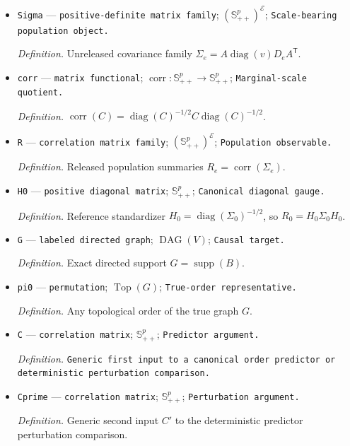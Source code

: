 \documentclass{article}
\begin{document}
\begin{itemize}
  \item \texttt{Sigma} --- \texttt{positive-\allowbreak{}definite matrix family}; \((\mathbb S_{++}^{p})^{\mathcal E}\); \texttt{Scale-\allowbreak{}bearing population object.}
  \par\smallskip\noindent\emph{Definition.} Unreleased covariance family \(\Sigma_e=A\operatorname{diag}(v)D_eA^{\mathsf T}\).
  \item \texttt{corr} --- \texttt{matrix functional}; \(\operatorname{corr}:\mathbb S_{++}^{p}\to\mathbb S_{++}^{p}\); \texttt{Marginal-\allowbreak{}scale quotient.}
  \par\smallskip\noindent\emph{Definition.} \(\operatorname{corr}(C)=\operatorname{diag}(C)^{-1/2}C\operatorname{diag}(C)^{-1/2}\).
  \item \texttt{R} --- \texttt{correlation matrix family}; \((\mathbb S_{++}^{p})^{\mathcal E}\); \texttt{Population observable.}
  \par\smallskip\noindent\emph{Definition.} Released population summaries \(R_e=\operatorname{corr}(\Sigma_e)\).
  \item \texttt{H0} --- \texttt{positive diagonal matrix}; \(\mathbb S_{++}^{p}\); \texttt{Canonical diagonal gauge.}
  \par\smallskip\noindent\emph{Definition.} Reference standardizer \(H_0=\operatorname{diag}(\Sigma_0)^{-1/2}\), so \(R_0=H_0\Sigma_0H_0\).
  \item \texttt{G} --- \texttt{labeled directed graph}; \(\operatorname{DAG}(V)\); \texttt{Causal target.}
  \par\smallskip\noindent\emph{Definition.} Exact directed support \(G=\operatorname{supp}(B)\).
  \item \texttt{pi0} --- \texttt{permutation}; \(\operatorname{Top}(G)\); \texttt{True-\allowbreak{}order representative.}
  \par\smallskip\noindent\emph{Definition.} Any topological order of the true graph \(G\).
  \item \texttt{C} --- \texttt{correlation matrix}; \(\mathbb S_{++}^{p}\); \texttt{Predictor argument.}
  \par\smallskip\noindent\emph{Definition.} \texttt{Generic first input to a canonical order predictor or deterministic perturbation comparison.}
  \item \texttt{Cprime} --- \texttt{correlation matrix}; \(\mathbb S_{++}^{p}\); \texttt{Perturbation argument.}
  \par\smallskip\noindent\emph{Definition.} Generic second input \(C'\) to the deterministic predictor perturbation comparison.

\end{itemize}
\end{document}
